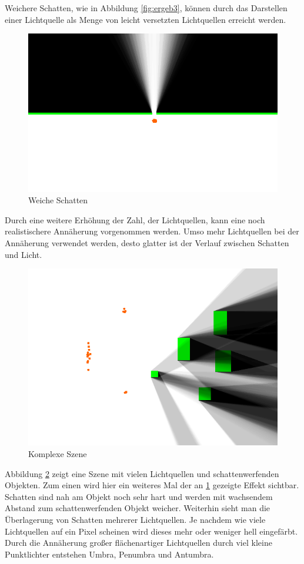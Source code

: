 Weichere Schatten, wie in Abbildung \ref{fig:ergeb3}, können durch das Darstellen einer Lichtquelle als Menge von leicht versetzten Lichtquellen erreicht werden.

\begin{figure}[t]
	\centering
	\includegraphics[width=\columnwidth]{images/ergebnis.png}
	\caption{Weiche Schatten}
	\label{fig:ergeb2}
\end{figure}

Durch eine weitere Erhöhung der Zahl, der Lichtquellen, kann eine noch realistischere Annäherung vorgenommen werden. Umso mehr Lichtquellen bei der Annäherung verwendet werden, desto glatter ist der Verlauf zwischen Schatten und Licht.

\begin{figure}[t]
	\centering
	\includegraphics[width=\columnwidth]{images/ergebnis_4.png}
	\caption{Komplexe Szene}
	\label{fig:ergeb1}
\end{figure}

Abbildung \ref{fig:ergeb1} zeigt eine Szene mit vielen Lichtquellen und schattenwerfenden Objekten. Zum einen wird hier ein weiteres Mal der an \ref{fig:ergeb2} gezeigte Effekt sichtbar. Schatten sind nah am Objekt noch sehr hart und werden mit wachsendem Abstand zum schattenwerfenden Objekt weicher. Weiterhin sieht man die Überlagerung von Schatten mehrerer Lichtquellen. Je nachdem wie viele Lichtquellen auf ein Pixel scheinen wird dieses mehr oder weniger hell eingefärbt. Durch die Annäherung großer flächenartiger Lichtquellen durch viel kleine Punktlichter entstehen Umbra, Penumbra und Antumbra.
